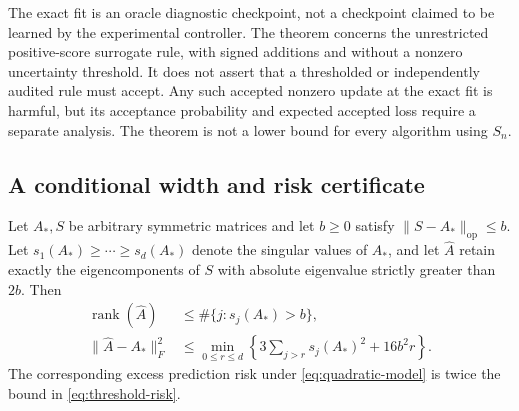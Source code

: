 The exact fit is an oracle diagnostic checkpoint, not a checkpoint claimed
to be learned by the experimental controller. The theorem concerns the
unrestricted positive-score surrogate rule, with signed additions and
without a nonzero uncertainty threshold. It does not assert that a
thresholded or independently audited rule must accept. Any such accepted
nonzero update at the exact fit is harmful, but its acceptance probability
and expected accepted loss require a separate analysis. The theorem is
not a lower bound for every algorithm using $S_n$.

\subsection{A conditional width and risk certificate}

\begin{theorem}
\label{thm:threshold-oracle}
Let $A_*,S$ be arbitrary symmetric matrices and let $b\geq0$ satisfy
$\|S-A_*\|_{\mathrm{op}}\leq b$. Let $s_1(A_*)\geq\cdots\geq s_d(A_*)$
denote the singular values of $A_*$, and let $\widehat A$ retain exactly
the eigencomponents of $S$ with absolute eigenvalue strictly greater
than $2b$. Then
\begin{align}
 \operatorname{rank}(\widehat A)
 &\leq\#\{j:s_j(A_*)>b\},
 \label{eq:threshold-rank}\\
 \|\widehat A-A_*\|_F^2
 &\leq\min_{0\leq r\leq d}
 \left\{3\sum_{j>r}s_j(A_*)^2+16b^2r\right\}.
 \label{eq:threshold-risk}
\end{align}
The corresponding excess prediction risk under
\eqref{eq:quadratic-model} is twice the bound in
\eqref{eq:threshold-risk}.
\end{theorem}
